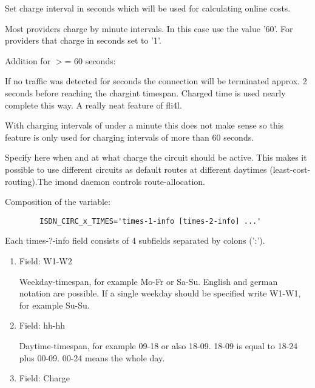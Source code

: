 \begin{description}
  
  Set charge interval in seconds which will be used for calculating online costs.
  
  Most providers charge by minute intervals. In this case use the value '60'. 
  For providers that charge in seconds set  to '1'.
  
  Addition for  $>$= 60 seconds:
  
  If no traffic was detected for  
  seconds the connection will be terminated approx. 2 seconds before reaching 
  the chargint timespan. Charged time is used nearly complete this way. A 
  really neat feature of fli4l.
  
  With charging intervals of under a minute this does not make sense so this 
  feature is only used for charging intervals of more than 60 seconds.
  
  
  Specify here when and at what charge the circuit should be active. 
  This makes it possible to use different circuits as default routes at 
  different daytimes (least-cost-routing).The imond daemon controls 
  route-allocation.
  
  Composition of the variable:

\begin{example}
\begin{verbatim}
        ISDN_CIRC_x_TIMES='times-1-info [times-2-info] ...'
\end{verbatim}
\end{example}

  
  Each times-?-info field consists of 4 subfields separated by colons (':').
  \begin{enumerate}
  \item Field: W1-W2
    
    Weekday-timespan, for example Mo-Fr or Sa-Su. English and german notation 
    are possible. If a single weekday should be specified write W1-W1, for 
    example Su-Su.
    
  \item Field: hh-hh
    
    Daytime-timespan, for example 09-18 or also 18-09. 18-09 is equal to 
    18-24 plus 00-09. 00-24 means the whole day.

  \item  Field: Charge
    

\end{enumerate}
\end{description}
